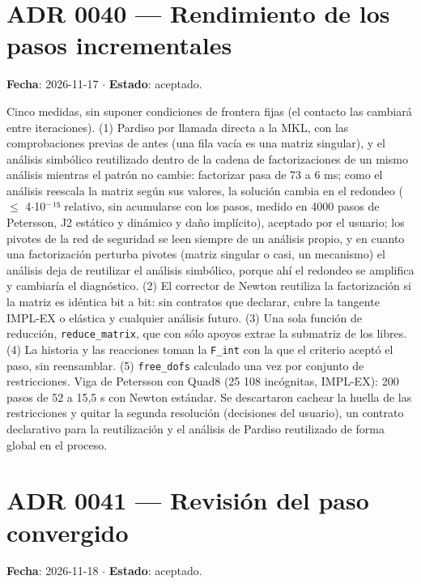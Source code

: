 \documentclass[11pt,oneside]{report}
\begin{document}
\section{ADR 0040 --- Rendimiento de los pasos incrementales}
\label{adr:0040}

\textbf{Fecha}: 2026-11-17 \ensuremath{\cdot} \textbf{Estado}: aceptado.

Cinco medidas, sin suponer condiciones de frontera fijas (el contacto las cambiará entre iteraciones). (1) Pardiso por llamada directa a la MKL, con las comprobaciones previas de antes (una fila vacía es una matriz singular), y el análisis simbólico reutilizado dentro de la cadena de factorizaciones de un mismo análisis mientras el patrón no cambie: factorizar pasa de 73 a 6 ms; como el análisis reescala la matriz según sus valores, la solución cambia en el redondeo (\ensuremath{\le} 4\ensuremath{\cdot}10\ensuremath{^{-}}¹⁵ relativo, sin acumularse con los pasos, medido en 4000 pasos de Petersson, J2 estático y dinámico y daño implícito), aceptado por el usuario; los pivotes de la red de seguridad se leen siempre de un análisis propio, y en cuanto una factorización perturba pivotes (matriz singular o casi, un mecanismo) el análisis deja de reutilizar el análisis simbólico, porque ahí el redondeo se amplifica y cambiaría el diagnóstico. (2) El corrector de Newton reutiliza la factorización si la matriz es idéntica bit a bit: sin contratos que declarar, cubre la tangente IMPL-EX o elástica y cualquier análisis futuro. (3) Una sola función de reducción, \texttt{reduce\_matrix}, que con sólo apoyos extrae la submatriz de los libres. (4) La historia y las reacciones toman la \texttt{F\_int} con la que el criterio aceptó el paso, sin reensamblar. (5) \texttt{free\_dofs} calculado una vez por conjunto de restricciones. Viga de Petersson con Quad8 (25 108 incógnitas, IMPL-EX): 200 pasos de 52 a 15,5 s con Newton estándar. Se descartaron cachear la huella de las restricciones y quitar la segunda resolución (decisiones del usuario), un contrato declarativo para la reutilización y el análisis de Pardiso reutilizado de forma global en el proceso.

\section{ADR 0041 --- Revisión del paso convergido}
\label{adr:0041}

\textbf{Fecha}: 2026-11-18 \ensuremath{\cdot} \textbf{Estado}: aceptado.
\end{document}

